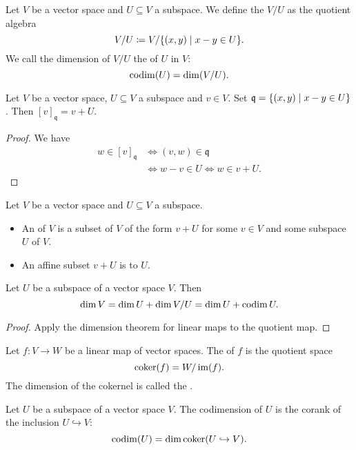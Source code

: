 \begin{definition}
Let $V$ be a vector space and $U\subseteq V$ a subspace.
We define the  $V/U$ as the quotient algebra
\[ V/U \defeq V/\setbuilder{(x,y)}{x-y\in U}. \]
We call the dimension of $V/U$ the  of $U$ in $V$:
\[ \operatorname{codim}(U) = \dim(V/U). \]
\end{definition}

\begin{lemma}
Let $V$ be a vector space, $U\subseteq V$ a subspace and $v\in V$. Set $\mathfrak{q} = \setbuilder{(x,y)}{x-y\in U}$. Then $[v]_\mathfrak{q} = v+U$.
\end{lemma}
\begin{proof}
We have
\begin{align*}
w\in [v]_\mathfrak{q} &\iff (v,w)\in\mathfrak{q} \\
&\iff w-v\in U \iff w \in v+U.
\end{align*}
\end{proof}

\begin{definition}
Let $V$ be a vector space and $U\subseteq V$ a subspace.
\begin{itemize}
\item An  of $V$ is a subset of $V$ of the form $v+U$ for some $v\in V$ and some subspace $U$ of $V$.
\item An affine subset $v+U$ is  to $U$.
\end{itemize}
\end{definition}

\begin{proposition} \label{dimensionTheoremQuotientSpace}
Let $U$ be a subspace of a vector space $V$. Then
\[ \dim V = \dim U + \dim V/U = \dim U + \operatorname{codim} U.  \]
\end{proposition}
\begin{proof}
Apply the dimension theorem for linear maps to the quotient map.
\end{proof}

\begin{definition}
Let $f:V\to W$ be a linear map of vector spaces. The  of $f$ is the quotient space
\[ \operatorname{coker}(f) = W/\operatorname{im}(f). \]
The dimension of the cokernel is called the .
\end{definition}
\begin{lemma}
Let $U$ be a subspace of a vector space $V$. The codimension of $U$ is the corank of the inclusion $U\hookrightarrow V$:
\[ \operatorname{codim}(U) = \dim\operatorname{coker}(U\hookrightarrow V). \]
\end{lemma}

